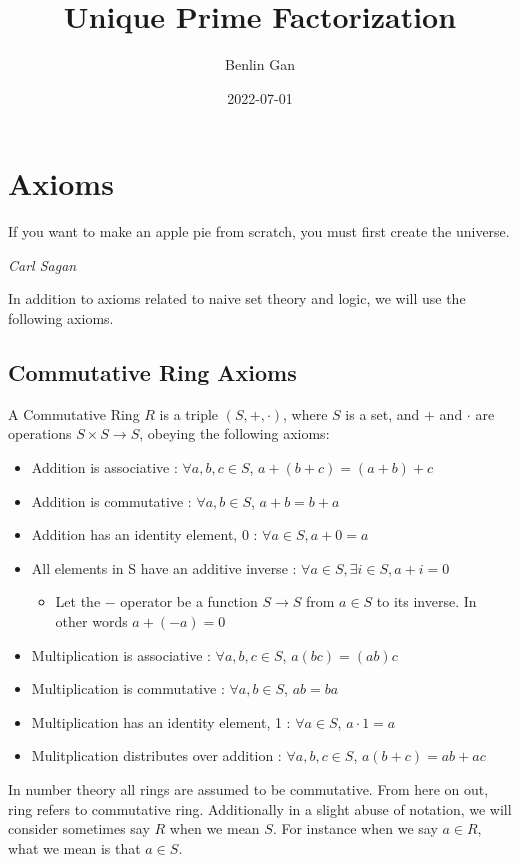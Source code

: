 \documentclass{article}
\title{Unique Prime Factorization}
\date{2022-07-01}
\author{Benlin Gan}
\begin{document}
  \maketitle
  \tableofcontents
  \newpage
  \section{Axioms}
  \epigraph{If you want to make an apple pie from scratch, you must first create the universe.}{\textit{Carl Sagan}}
  In addition to axioms related to naive set theory and logic, we will use the following axioms.
  \subsection{Commutative Ring Axioms}
  A Commutative Ring $R$ is a triple $(S, +, \cdot)$, where $S$ is a set, and $+$ and $\cdot$ are operations $S \times S \to S$, obeying the following axioms:
  \begin{itemize}
  \item Addition is associative : $\forall a, b, c \in S$, $a + (b + c) = (a + b) + c$
  \item Addition is commutative : $\forall a, b \in S$, $a + b = b + a$
  \item Addition has an identity element, 0 : $\forall a \in S, a + 0 = a$
  \item All elements in S have an additive inverse : $\forall a \in S, \exists i \in S, a + i = 0$
    \begin{itemize}
    \item Let the $-$ operator be a function $S \to S$ from $a \in S$ to its inverse. In other words $a + (-a) = 0$
    \end{itemize}
  \item Multiplication is associative : $\forall a, b, c \in S$, $a(bc) = (ab)c$
  \item Multiplication is commutative : $\forall a, b \in S$, $ab = ba$
  \item Multiplication has an identity element, 1 : $\forall a \in S$, $a \cdot 1 = a$
  \item Mulitplication distributes over addition : $\forall a, b, c \in S$, $a(b + c) = ab + ac$
  \end{itemize}
  In number theory all rings are assumed to be commutative. From here on out, ring refers to commutative ring. Additionally in a slight abuse of notation, we will consider sometimes say $R$ when we mean $S$. For instance when we say $a \in R$, what we mean is that $a \in S$.\\\\
\end{document}
